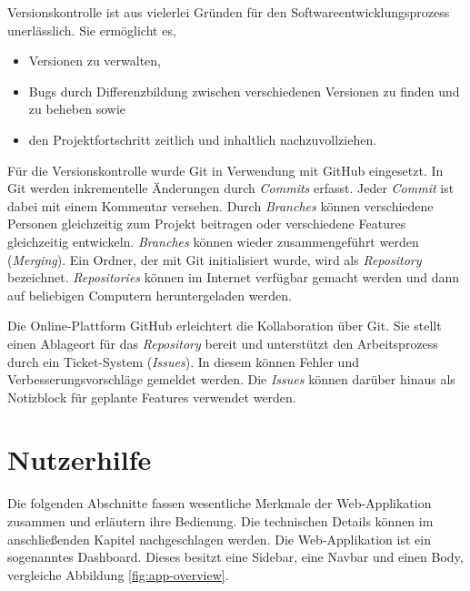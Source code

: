 \documentclass[
]{article}
\providecommand{\tightlist}{%
  \setlength{\itemsep}{0pt}\setlength{\parskip}{0pt}}
\begin{document}
Versionskontrolle ist aus vielerlei Gründen für den Softwareentwicklungsprozess unerlässlich. Sie ermöglicht es,

\begin{itemize}
\tightlist
\item
  Versionen zu verwalten,
\item
  Bugs durch Differenzbildung zwischen verschiedenen Versionen zu finden und zu beheben sowie
\item
  den Projektfortschritt zeitlich und inhaltlich nachzuvollziehen. \autocite[vgl.][S.3-18]{Tsitoara2020}
\end{itemize}

Für die Versionskontrolle wurde Git in Verwendung mit GitHub eingesetzt. In Git werden inkrementelle Änderungen durch \emph{Commits} erfasst. Jeder \emph{Commit} ist dabei mit einem Kommentar versehen. Durch \emph{Branches} können verschiedene Personen gleichzeitig zum Projekt beitragen oder verschiedene Features gleichzeitig entwickeln. \emph{Branches} können wieder zusammengeführt werden (\emph{Merging}). Ein Ordner, der mit Git initialisiert wurde, wird als \emph{Repository} bezeichnet. \emph{Repositories} können im Internet verfügbar gemacht werden und dann auf beliebigen Computern heruntergeladen werden. \autocite[vgl.][S.3-18]{Tsitoara2020}

Die Online-Plattform GitHub erleichtert die Kollaboration über Git. Sie stellt einen Ablageort für das \emph{Repository} bereit und unterstützt den Arbeitsprozess durch ein Ticket-System (\emph{Issues}). In diesem können Fehler und Verbesserungsvorschläge gemeldet werden. Die \emph{Issues} können darüber hinaus als Notizblock für geplante Features verwendet werden. \autocite[vgl.][S.87-104]{Tsitoara2020}

\hypertarget{user-guide}{%
\section{Nutzerhilfe}\label{user-guide}}

Die folgenden Abschnitte fassen wesentliche Merkmale der Web-Applikation zusammen und erläutern ihre Bedienung. Die technischen Details können im anschließenden Kapitel nachgeschlagen werden. Die Web-Applikation ist ein sogenanntes Dashboard. Dieses besitzt eine Sidebar, eine Navbar und einen Body, vergleiche Abbildung \ref{fig:app-overview}.
\end{document}
